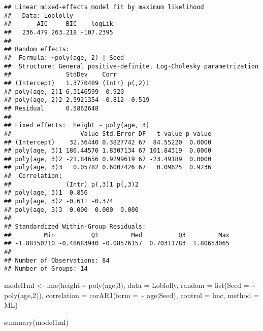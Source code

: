 \documentclass[
]{book}
\newenvironment{Shaded}{\begin{snugshade}}{\end{snugshade}}
\newcommand{\AttributeTok}[1]{\textcolor[rgb]{0.77,0.63,0.00}{#1}}
\newcommand{\DecValTok}[1]{\textcolor[rgb]{0.00,0.00,0.81}{#1}}
\newcommand{\FunctionTok}[1]{\textcolor[rgb]{0.00,0.00,0.00}{#1}}
\newcommand{\NormalTok}[1]{#1}
\newcommand{\OtherTok}[1]{\textcolor[rgb]{0.56,0.35,0.01}{#1}}
\newcommand{\SpecialCharTok}[1]{\textcolor[rgb]{0.00,0.00,0.00}{#1}}
\newcommand{\StringTok}[1]{\textcolor[rgb]{0.31,0.60,0.02}{#1}}
\begin{document}
\begin{verbatim}
## Linear mixed-effects model fit by maximum likelihood
##   Data: Loblolly 
##       AIC     BIC    logLik
##   236.479 263.218 -107.2395
## 
## Random effects:
##  Formula: ~poly(age, 2) | Seed
##  Structure: General positive-definite, Log-Cholesky parametrization
##               StdDev    Corr         
## (Intercept)   1.3770489 (Intr) p(,2)1
## poly(age, 2)1 6.3146599  0.920       
## poly(age, 2)2 2.5921354 -0.812 -0.519
## Residual      0.5862648              
## 
## Fixed effects:  height ~ poly(age, 3) 
##                   Value Std.Error DF   t-value p-value
## (Intercept)    32.36440 0.3827742 67  84.55220  0.0000
## poly(age, 3)1 186.44570 1.8307134 67 101.84319  0.0000
## poly(age, 3)2 -21.84656 0.9299619 67 -23.49189  0.0000
## poly(age, 3)3   0.05782 0.6007426 67   0.09625  0.9236
##  Correlation: 
##               (Intr) p(,3)1 p(,3)2
## poly(age, 3)1  0.856              
## poly(age, 3)2 -0.611 -0.374       
## poly(age, 3)3  0.000  0.000  0.000
## 
## Standardized Within-Group Residuals:
##         Min          Q1         Med          Q3         Max 
## -1.88150210 -0.48683940 -0.08576157  0.70311783  1.80653065 
## 
## Number of Observations: 84
## Number of Groups: 14
\end{verbatim}

\begin{Shaded}
\begin{Highlighting}[]
\NormalTok{model1ml }\OtherTok{\textless{}{-}} \FunctionTok{lme}\NormalTok{(height }\SpecialCharTok{\textasciitilde{}} \FunctionTok{poly}\NormalTok{(age,}\DecValTok{3}\NormalTok{), }\AttributeTok{data =}\NormalTok{ Loblolly,}
\AttributeTok{random =} \FunctionTok{list}\NormalTok{(}\AttributeTok{Seed =} \SpecialCharTok{\textasciitilde{}} \FunctionTok{poly}\NormalTok{(age,}\DecValTok{2}\NormalTok{)),}
\AttributeTok{correlation =} \FunctionTok{corAR1}\NormalTok{(}\AttributeTok{form =} \SpecialCharTok{\textasciitilde{}}\NormalTok{ age}\SpecialCharTok{|}\NormalTok{Seed), }\AttributeTok{control =}\NormalTok{ lmc, }\AttributeTok{method =} \StringTok{\textquotesingle{}ML\textquotesingle{}}\NormalTok{)}

\FunctionTok{summary}\NormalTok{(model1ml)}
\end{Highlighting}
\end{Shaded}
\end{document}
